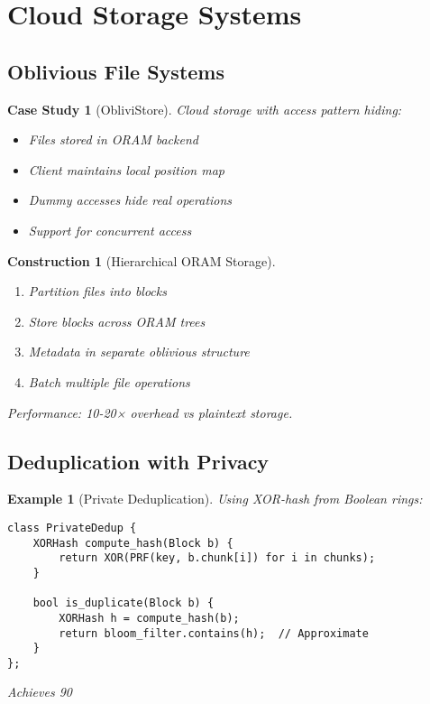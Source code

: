 \documentclass[11pt,final,hidelinks]{article}
\newtheorem{example}[theorem]{Example}
\newtheorem{construction}[theorem]{Construction}
\newtheorem{casestudy}[theorem]{Case Study}
\begin{document}
\section{Cloud Storage Systems}

\subsection{Oblivious File Systems}

\begin{casestudy}[ObliviStore]
Cloud storage with access pattern hiding:
\begin{itemize}
    \item Files stored in ORAM backend
    \item Client maintains local position map
    \item Dummy accesses hide real operations
    \item Support for concurrent access
\end{itemize}
\end{casestudy}

\begin{construction}[Hierarchical ORAM Storage]
\begin{enumerate}
    \item Partition files into blocks
    \item Store blocks across ORAM trees
    \item Metadata in separate oblivious structure
    \item Batch multiple file operations
\end{enumerate}
Performance: 10-20× overhead vs plaintext storage.
\end{construction}

\subsection{Deduplication with Privacy}

\begin{example}[Private Deduplication]
Using XOR-hash from Boolean rings:
\begin{verbatim}
class PrivateDedup {
    XORHash compute_hash(Block b) {
        return XOR(PRF(key, b.chunk[i]) for i in chunks);
    }
    
    bool is_duplicate(Block b) {
        XORHash h = compute_hash(b);
        return bloom_filter.contains(h);  // Approximate
    }
};
\end{verbatim}
Achieves 90%
\end{example}
\end{document}
